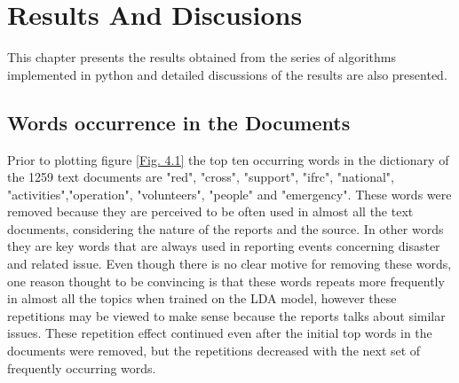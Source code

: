 \chapter{Results And Discusions}
This chapter presents the results obtained from the series of algorithms implemented in python
and detailed discussions of the results are also presented. 
\section{Words occurrence in the Documents}


Prior to plotting figure \eqref{Fig. 4.1}
the top ten occurring words in the dictionary of the 1259 text documents
are "red", "cross",  "support", "ifrc", "national", "activities","operation", "volunteers", "people" and "emergency". These words were removed because they are perceived  to be often used in almost all the text documents, considering the nature of the reports and the source. In other words they are key words that are always used in reporting events concerning disaster and  related issue. Even though there is no clear motive for removing these words, one reason thought to be convincing is that these words repeats more frequently in almost all the topics when trained on  the LDA model, however these repetitions may be viewed to make sense because the reports talks about similar issues. These repetition effect continued even after the initial top words in the documents were removed, but  the repetitions decreased with the next set of frequently occurring words.
